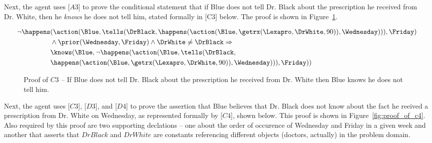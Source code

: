 \noindent Next, the agent uses [$A3$] to prove the conditional statement that if Blue does not tell Dr. Black about the prescription he received from Dr. White, then he \emph{knows} he does not tell him, stated formally in [C3] below.  The proof is shown in Figure~\ref{fig:proof_of_c3}.

\begin{footnotesize}
\begin{align*}
[C3] \ \neg \happens&(\action(\Blue,\tells(\DrBlack,\happens(\action(\Blue,\getrx(\Lexapro,\DrWhite,90)),\Wednesday))),\Friday) \\
& \wedge \prior(\Wednesday,\Friday) \wedge \DrWhite \neq \DrBlack \Rightarrow \\
& \knows(\Blue, \neg \happens(\action(\Blue,\tells(\DrBlack,\\ 
& \happens(\action(\Blue,\getrx(\Lexapro,\DrWhite,90)),\Wednesday))),\Friday))
\end{align*}
\end{footnotesize}

\begin{figure}[h!] 
\vspace{6pt}
\centering
{}
\caption{Proof of $C3$ -- If Blue does not tell Dr. Black about the prescription he received from Dr. White then Blue knows he does not tell him.}
\label{fig:proof_of_c3}
\end{figure}



\noindent Next, the agent uses [$C3$], [$D3$], and [$D4$] to prove the assertion that Blue believes that Dr. Black does not know about the fact he reeived a prescription from Dr. White on Wednesday, as represented formally by [$C4$], shown below.  This proof is shown in Figure~\ref{fig:proof_of_c4}.  Also required by this proof are two supporting declations -- one about the order of occurence of Wednesday and Friday in a given week and another that asserts that $DrBlack$ and $DrWhite$ are constants referencing different objects (doctors, actually) in the problem domain.

